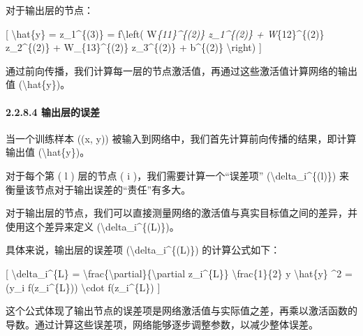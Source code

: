 对于输出层的节点：

{[} \textbackslash hat\{y\} = z\_1\^{}\{(3)\} = f\textbackslash left(
W\emph{\{11\}\^{}\{(2)\} z\_1\^{}\{(2)\} + W}\{12\}\^{}\{(2)\}
z\_2\^{}\{(2)\} + W\_\{13\}\^{}\{(2)\} z\_3\^{}\{(2)\} + b\^{}\{(2)\}
\textbackslash right) {]}


通过前向传播，我们计算每一层的节点激活值，再通过这些激活值计算网络的输出值
(\textbackslash hat\{y\})。

\paragraph{\texorpdfstring{\textbf{2.2.8.4}
\textbf{输出层的误差}}{2.2.8.4 输出层的误差}}\label{2284-ux8f93ux51faux5c42ux7684ux8befux5dee}

当一个训练样本 ((x, y))
被输入到网络中，我们首先计算前向传播的结果，即计算输出值
(\textbackslash hat\{y\})。

对于每个第 ( l ) 层的节点 ( i )，我们需要计算一个``误差项''
(\textbackslash delta\_i\^{}\{(l)\})
来衡量该节点对于输出误差的``责任''有多大。


对于输出层的节点，我们可以直接测量网络的激活值与真实目标值之间的差异，并使用这个差异来定义
(\textbackslash delta\_i\^{}\{(L)\})。

具体来说，输出层的误差项 (\textbackslash delta\_i\^{}\{(L)\})
的计算公式如下：

{[} \textbackslash delta\_i\^{}\{L\} =
\textbackslash frac\{\textbackslash partial\}\{\textbackslash partial
z\_i\^{}\{L\}\} \textbackslash frac\{1\}\{2\} \textbar{} y
\textbackslash hat\{y\} \textbar{}\^{}2 = (y\_i f(z\_i\^{}\{L\}))
\textbackslash cdot f\textquotesingle(z\_i\^{}\{L\}) {]}


这个公式体现了输出节点的误差项是网络激活值与实际值之差，再乘以激活函数的导数。通过计算这些误差项，网络能够逐步调整参数，以减少整体误差。

\paragraph{\texorpdfstring{ }{ }}

